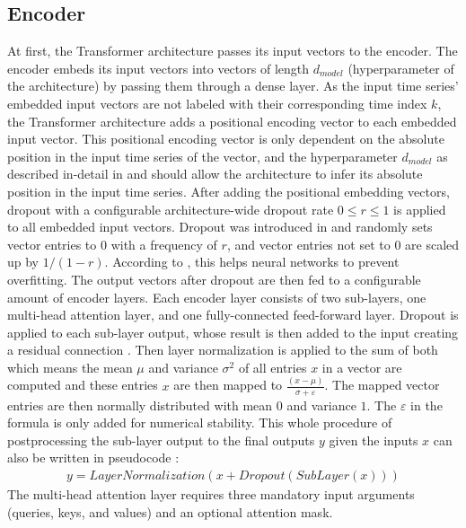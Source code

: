 \documentclass[draft,final]{vutinfth} %
\begin{document}
    \subsection{Encoder} \label{transformer_encoder}
    At first, the Transformer architecture passes its input vectors to the encoder.
    The encoder embeds its input vectors into vectors of length $d_{model}$ (hyperparameter of the architecture) by passing them through a dense layer.
    As the input time series' embedded input vectors are not labeled with their corresponding time index $k$, the Transformer architecture adds a positional encoding vector to each embedded input vector.
    This positional encoding vector is only dependent on the absolute position in the input time series of the vector, and the hyperparameter $d_{model}$ as described in-detail in \cite[p. 6]{Transformer} and should allow the architecture to infer its absolute position in the input time series.
    After adding the positional embedding vectors, dropout with a configurable architecture-wide dropout rate $0 \leq r \leq 1$ is applied to all embedded input vectors.
    Dropout was introduced in \cite{dropout} and randomly sets vector entries to $0$ with a frequency of $r$, and vector entries not set to $0$ are scaled up by $1/(1-r)$.
    According to \cite[p. 1]{dropout}, this helps neural networks to prevent overfitting.
    The output vectors after dropout are then fed to a configurable amount of encoder layers.
    Each encoder layer consists of two sub-layers, one multi-head attention layer, and one fully-connected feed-forward layer.
    Dropout is applied to each sub-layer output, whose result is then added to the input creating a residual connection \cite{ResNet}.
    Then layer normalization \cite{layer_norm} is applied to the sum of both which means the mean $\mu$ and variance $\sigma^2$ of all entries $x$ in a vector are computed and these entries $x$ are then mapped to $\frac{(x-\mu)}{\sigma + \varepsilon}$.
    The mapped vector entries are then normally distributed with mean $0$ and variance $1$. The $\varepsilon$ in the formula is only added for numerical stability.
    This whole procedure of postprocessing the sub-layer output to the final outputs $y$ given the inputs $x$ can also be written in pseudocode \cite[p. 3]{Transformer}:
    \begin{align}
        y = LayerNormalization(x + Dropout(SubLayer(x)))
    \end{align}
    The multi-head attention layer requires three mandatory input arguments (queries, keys, and values) and an optional attention mask.
\end{document}
